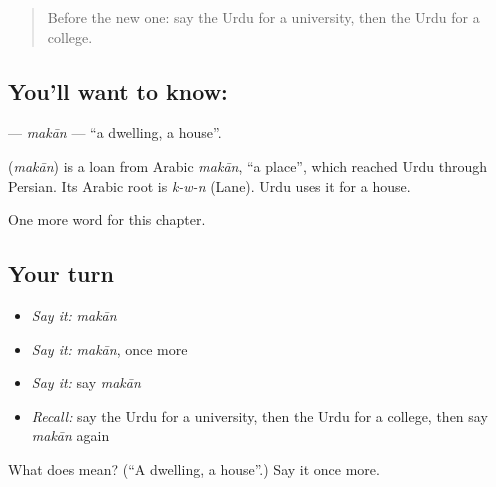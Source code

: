 \label{lesson:UR-C190-makan}



\begin{quote}
Before the new one: say the Urdu for a university, then the Urdu for a college.
\end{quote}

\subsection*{You'll want to know: }
\textbf{} — \emph{makān} — \textquotedblleft{}a dwelling, a house\textquotedblright{}.

\begin{cousinweb}
\textbf{} (\emph{makān}) is a loan from Arabic \emph{makān}, \textquotedblleft{}a place\textquotedblright{}, which reached Urdu through Persian. Its Arabic root is \emph{k-w-n} (Lane). Urdu uses it for a house.
\end{cousinweb}

\begin{grammarlens}[title={What you've built}]
One more word for this chapter.
\end{grammarlens}

\subsection*{Your turn}
\begin{itemize}
\raggedright
  \item \emph{Say it:} \emph{makān}
  \item \emph{Say it:} \emph{makān}, once more
  \item \emph{Say it:} say \emph{makān}
  \item \emph{Recall:} say the Urdu for a university, then the Urdu for a college, then say \emph{makān} again
\end{itemize}

\begin{tcolorbox}[breakable,colback=teal!4,colframe=teal!35!black,title={Before you move on}]
What does  mean? (\textquotedblleft{}A dwelling, a house\textquotedblright{}.) Say it once more.
\end{tcolorbox}
